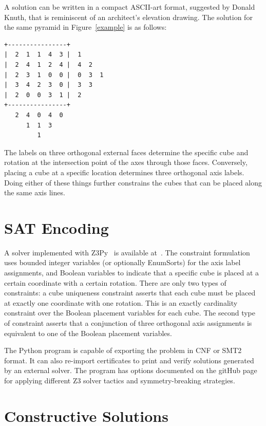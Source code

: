 \documentclass[conference]{IEEEtran}
\begin{document}
A solution can be written in a compact ASCII-art format, suggested by Donald Knuth, that is reminiscent of an architect's elevation drawing.
The solution for the same pyramid in Figure~\ref{example} is as follows:

\begin{center}
\begin{small}
\begin{BVerbatim}
+----------------+
|  2  1  1  4  3 |  1
|  2  4  1  2  4 |  4  2
|  2  3  1  0  0 |  0  3  1
|  3  4  2  3  0 |  3  3
|  2  0  0  3  1 |  2
+----------------+
   2  4  0  4  0
      1  1  3
         1
\end{BVerbatim}
\end{small}
\end{center}

The labels on three orthogonal external faces determine the specific cube and rotation at the intersection point of the axes through those faces.
Conversely, placing a cube at a specific location determines three orthogonal axis labels.
Doing either of these things further constrains the cubes that can be placed along the same axis lines.

\section{SAT Encoding}

A solver implemented with Z3Py~\cite{z3} is available at~\cite{b1}.
The constraint formulation uses bounded integer variables (or optionally EnumSorts) for the axis label assignments,
and Boolean variables to indicate that a specific cube is placed at a certain coordinate with a certain rotation.
There are only two types of constraints: a cube uniqueness constraint asserts that each cube must be placed at exactly one coordinate with one rotation.
This is an exactly cardinality constraint over the Boolean placement variables for each cube.
The second type of constraint asserts that a conjunction of three orthogonal axis assignments is equivalent to one of the Boolean placement variables.

The Python program is capable of exporting the problem in CNF or SMT2 format.
It can also re-import certificates to print and verify solutions generated by an external solver.
The program has options documented on the gitHub page for applying different Z3 solver tactics and symmetry-breaking strategies.

\section{Constructive Solutions}
\end{document}
